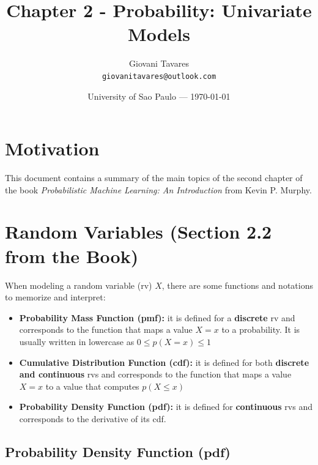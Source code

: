 \documentclass{article}
\title{Chapter 2 - Probability: Univariate Models} %
\author{Giovani Tavares\\ \texttt{giovanitavares@outlook.com}} %
\date{University of Sao Paulo --- \today} %
\begin{document}
\maketitle %


\section*{Motivation} %

This document contains a summary of the main topics of the second chapter of the book \textit{Probabilistic Machine Learning: An Introduction} from Kevin P. Murphy.



\section{Random Variables (Section 2.2 from the Book)}
When modeling a random variable (rv) $X$, there are some functions and notations to memorize and interpret:

\begin{itemize}
	\item \textbf{Probability Mass Function (pmf):} it is defined for a \textbf{discrete} rv and corresponds to the function that maps a value $X = x$ to a probability. It is usually written in lowercase as $0 \leq p(X = x) \leq 1$ 
	\item \textbf{Cumulative Distribution  Function (cdf):} it is defined for both \textbf{discrete and continuous} rvs and corresponds to the function that maps a value $X = x$ to a value that computes $p(X \leq x)$
	\item \textbf{Probability Density Function (pdf):} it is defined for  \textbf{continuous} rvs and corresponds to the derivative of its cdf.	
\end{itemize}

\subsection{Probability Density Function ($\mathbf{pdf}$)}
\end{document}
